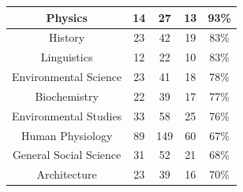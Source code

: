 \documentclass[10pt]{article}
\begin{document}
\begin{longtable}[c]{|ccccc|}
	\multicolumn{1}{|c|}{Physics}                                    & \multicolumn{1}{c|}{14}                              & \multicolumn{1}{c|}{27}                                  & \multicolumn{1}{c|}{13}                 & 93\%                  \\ \hline
	\multicolumn{1}{|c|}{History}                                    & \multicolumn{1}{c|}{23}                              & \multicolumn{1}{c|}{42}                                  & \multicolumn{1}{c|}{19}                 & 83\%                  \\ \hline
	\multicolumn{1}{|c|}{Linguistics}                                & \multicolumn{1}{c|}{12}                              & \multicolumn{1}{c|}{22}                                  & \multicolumn{1}{c|}{10}                 & 83\%                  \\ \hline
	\multicolumn{1}{|c|}{Environmental Science}                      & \multicolumn{1}{c|}{23}                              & \multicolumn{1}{c|}{41}                                  & \multicolumn{1}{c|}{18}                 & 78\%                  \\ \hline
	\multicolumn{1}{|c|}{Biochemistry}                               & \multicolumn{1}{c|}{22}                              & \multicolumn{1}{c|}{39}                                  & \multicolumn{1}{c|}{17}                 & 77\%                  \\ \hline
	\multicolumn{1}{|c|}{Environmental Studies}                      & \multicolumn{1}{c|}{33}                              & \multicolumn{1}{c|}{58}                                  & \multicolumn{1}{c|}{25}                 & 76\%                  \\ \hline
	\multicolumn{1}{|c|}{Human Physiology}                           & \multicolumn{1}{c|}{89}                              & \multicolumn{1}{c|}{149}                                 & \multicolumn{1}{c|}{60}                 & 67\%                  \\ \hline
	\multicolumn{1}{|c|}{General Social Science}                     & \multicolumn{1}{c|}{31}                              & \multicolumn{1}{c|}{52}                                  & \multicolumn{1}{c|}{21}                 & 68\%                  \\ \hline
	\multicolumn{1}{|c|}{Architecture}                               & \multicolumn{1}{c|}{23}                              & \multicolumn{1}{c|}{39}                                  & \multicolumn{1}{c|}{16}                 & 70\%                  \\ \hline

\end{longtable}
\end{document}
